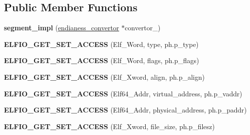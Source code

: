 \subsection*{Public Member Functions}
\begin{DoxyCompactItemize}
\item 
{\bfseries segment\+\_\+impl} (\hyperlink{class_e_l_f_i_o_1_1endianess__convertor}{endianess\+\_\+convertor} $\ast$convertor\+\_\+)\hypertarget{class_e_l_f_i_o_1_1segment__impl_ae4d90afa8bd12ffdc59a4b32161c3135}{}\label{class_e_l_f_i_o_1_1segment__impl_ae4d90afa8bd12ffdc59a4b32161c3135}

\item 
{\bfseries E\+L\+F\+I\+O\+\_\+\+G\+E\+T\+\_\+\+S\+E\+T\+\_\+\+A\+C\+C\+E\+SS} (Elf\+\_\+\+Word, type, ph.\+p\+\_\+type)\hypertarget{class_e_l_f_i_o_1_1segment__impl_aa77f39e7dc08369a3c42c2a4e9d219e1}{}\label{class_e_l_f_i_o_1_1segment__impl_aa77f39e7dc08369a3c42c2a4e9d219e1}

\item 
{\bfseries E\+L\+F\+I\+O\+\_\+\+G\+E\+T\+\_\+\+S\+E\+T\+\_\+\+A\+C\+C\+E\+SS} (Elf\+\_\+\+Word, flags, ph.\+p\+\_\+flags)\hypertarget{class_e_l_f_i_o_1_1segment__impl_a1838cda04f7ff4336a1dbd6b18a2da07}{}\label{class_e_l_f_i_o_1_1segment__impl_a1838cda04f7ff4336a1dbd6b18a2da07}

\item 
{\bfseries E\+L\+F\+I\+O\+\_\+\+G\+E\+T\+\_\+\+S\+E\+T\+\_\+\+A\+C\+C\+E\+SS} (Elf\+\_\+\+Xword, align, ph.\+p\+\_\+align)\hypertarget{class_e_l_f_i_o_1_1segment__impl_a20371d74e4019472a675b063264c729b}{}\label{class_e_l_f_i_o_1_1segment__impl_a20371d74e4019472a675b063264c729b}

\item 
{\bfseries E\+L\+F\+I\+O\+\_\+\+G\+E\+T\+\_\+\+S\+E\+T\+\_\+\+A\+C\+C\+E\+SS} (Elf64\+\_\+\+Addr, virtual\+\_\+address, ph.\+p\+\_\+vaddr)\hypertarget{class_e_l_f_i_o_1_1segment__impl_a5034684286c985a5d8e1516d107cd8c5}{}\label{class_e_l_f_i_o_1_1segment__impl_a5034684286c985a5d8e1516d107cd8c5}

\item 
{\bfseries E\+L\+F\+I\+O\+\_\+\+G\+E\+T\+\_\+\+S\+E\+T\+\_\+\+A\+C\+C\+E\+SS} (Elf64\+\_\+\+Addr, physical\+\_\+address, ph.\+p\+\_\+paddr)\hypertarget{class_e_l_f_i_o_1_1segment__impl_a1e3e95335f9717c5cbfc72b395606dca}{}\label{class_e_l_f_i_o_1_1segment__impl_a1e3e95335f9717c5cbfc72b395606dca}

\item 
{\bfseries E\+L\+F\+I\+O\+\_\+\+G\+E\+T\+\_\+\+S\+E\+T\+\_\+\+A\+C\+C\+E\+SS} (Elf\+\_\+\+Xword, file\+\_\+size, ph.\+p\+\_\+filesz)\hypertarget{class_e_l_f_i_o_1_1segment__impl_a1104c96bde9841dc2f41e897b82177c9}{}\label{class_e_l_f_i_o_1_1segment__impl_a1104c96bde9841dc2f41e897b82177c9}


\end{DoxyCompactItemize}
